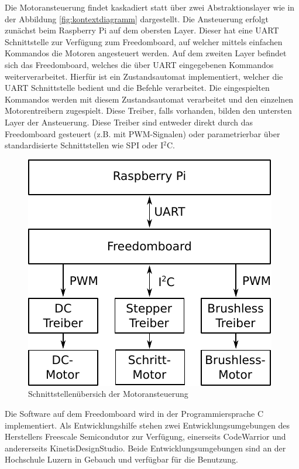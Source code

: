 Die Motoransteuerung findet kaskadiert statt über zwei Abstraktionslayer
wie in der Abbildung \ref{fig:kontextdiagramm} dargestellt. Die Ansteuerung
erfolgt zunächst beim Raspberry Pi auf dem obersten Layer. Dieser hat eine
UART Schnittstelle zur Verfügung zum Freedomboard, auf welcher mittels
einfachen Kommandos die Motoren angesteuert werden. 
%
Auf dem zweiten Layer befindet sich das Freedomboard, welches die über UART
eingegebenen Kommandos weiterverarbeitet. Hierfür ist ein Zustandsautomat
implementiert, welcher die UART Schnittstelle bedient und die Befehle
verarbeitet.
%
Die eingespielten Kommandos werden mit diesem Zustandsautomat verarbeitet und
den einzelnen Motorentreibern zugespielt. Diese Treiber, falls vorhanden,
bilden den untersten Layer der Ansteuerung. Diese Treiber sind entweder
direkt durch das Freedomboard gesteuert (z.B. mit PWM-Signalen) oder 
parametrierbar über standardisierte Schnittstellen wie SPI oder I$^2$C.

\begin{figure}[h!]
	\centering
	\includegraphics[scale=1]{../../fig/motor-control-overview.pdf}
	\caption{Schnittstellenübersich der Motoransteuerung}
\end{figure}

Die Software auf dem Freedomboard wird in der Programmiersprache C
implementiert. Als Entwicklungshilfe stehen zwei Entwicklungsumgebungen
des Herstellers Freescale Semicondutor zur Verfügung, einerseits CodeWarrior
und andererseits KinetisDesignStudio. Beide Entwicklungsumgebungen sind
an der Hochschule Luzern in Gebauch und verfügbar für die Benutzung.
